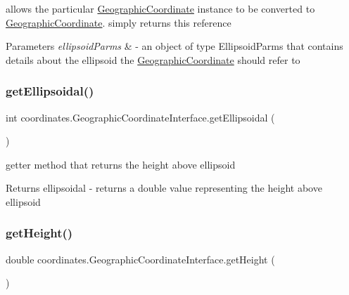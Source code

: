allows the particular \hyperlink{classcoordinates_1_1_geographic_coordinate}{Geographic\+Coordinate} instance to be converted to \hyperlink{classcoordinates_1_1_geographic_coordinate}{Geographic\+Coordinate}. simply returns this reference 


\begin{DoxyParams}{Parameters}
{\em ellipsoid\+Parms} & -\/ an object of type Ellipsoid\+Parms that contains details about the ellipsoid the \hyperlink{classcoordinates_1_1_geographic_coordinate}{Geographic\+Coordinate} should refer to \\
\hline
\end{DoxyParams}
\mbox{\label{classcoordinates_1_1_geographic_coordinate_interface_a76520d9a7902acdfe223d848eb784fc1}} 
\subsubsection{\texorpdfstring{get\+Ellipsoidal()}{getEllipsoidal()}}
{\footnotesize\ttfamily int coordinates.\+Geographic\+Coordinate\+Interface.\+get\+Ellipsoidal (\begin{DoxyParamCaption}{ }\end{DoxyParamCaption})}



getter method that returns the height above ellipsoid 

\begin{DoxyReturn}{Returns}
ellipsoidal -\/ returns a double value representing the height above ellipsoid 
\end{DoxyReturn}
\mbox{\label{classcoordinates_1_1_geographic_coordinate_interface_aa74362408871d3bf33e69f6e2ffa52b6}} 
\subsubsection{\texorpdfstring{get\+Height()}{getHeight()}}
{\footnotesize\ttfamily double coordinates.\+Geographic\+Coordinate\+Interface.\+get\+Height (\begin{DoxyParamCaption}{ }\end{DoxyParamCaption})}



